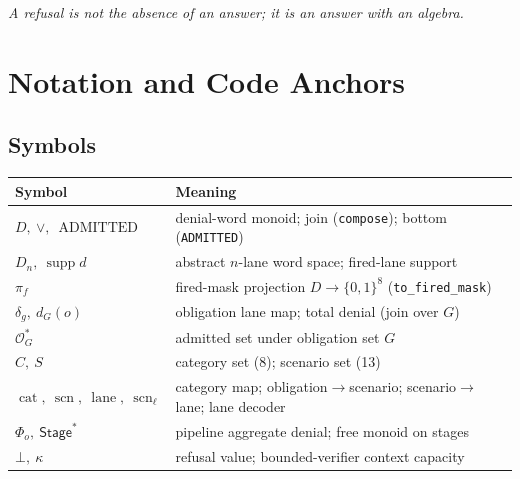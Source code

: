 \documentclass[11pt,oneside]{book}
\theoremstyle{definition}
\theoremstyle{plain}
\theoremstyle{remark}
\newcommand{\Adm}{\mathcal{O}^{*}}             %
\newcommand{\Rfsl}{\bot}                        %
\newcommand{\CL}{\kappa}                       %
\DeclareMathOperator{\supp}{supp}
\newcommand{\code}[1]{\texttt{#1}}
\newcommand{\Deny}{D}                 %
\newcommand{\Adml}{\operatorname{ADMITTED}}          %
\newcommand{\firedmap}{\pi_{f}}                %
\newcommand{\Catset}{C}              %
\newcommand{\Scnset}{S}              %
\DeclareMathOperator{\catop}{cat}
\DeclareMathOperator{\laneop}{lane}
\DeclareMathOperator{\scnop}{scn}
\begin{document}
\begin{center}\itshape A refusal is not the absence of an answer; it is an answer with an algebra.\end{center}

\appendix
\chapter{Notation and Code Anchors}

\section*{Symbols}
\begin{center}
\begin{tabular}{ll}
\toprule
Symbol & Meaning\\
\midrule
$\Deny,\ \lor,\ \Adml$ & denial-word monoid; join (\code{compose}); bottom (\code{ADMITTED})\\
$\Deny_n,\ \supp d$ & abstract $n$-lane word space; fired-lane support\\
$\firedmap$ & fired-mask projection $\Deny\to\{0,1\}^{8}$ (\code{to\_fired\_mask})\\
$\delta_g,\ d_G(o)$ & obligation lane map; total denial (join over $G$)\\
$\Adm_G$ & admitted set under obligation set $G$\\
$\Catset,\ \Scnset$ & category set (8); scenario set (13)\\
$\catop,\ \scnop,\ \laneop,\ \scnop_\ell$ & category map; obligation$\to$scenario; scenario$\to$lane; lane decoder\\
$\Phi_o,\ \mathsf{Stage}^{*}$ & pipeline aggregate denial; free monoid on stages\\
$\Rfsl,\ \CL$ & refusal value; bounded-verifier context capacity\\
\bottomrule
\end{tabular}
\end{center}
\end{document}
